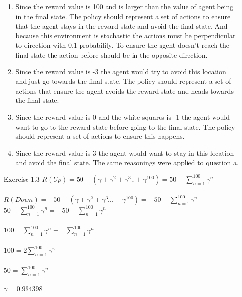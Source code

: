 \documentclass[letterpaper, 12pt]{article}
\begin{document}
\begin{enumerate}
    \begin{enumerate}
        \item Since the reward value is 100 and is larger than the value of agent being in the final state. 
        The policy should represent a set of actions to ensure that the agent stays in the reward state and avoid the final state. 
        And because this environment is stochastic the actions must be perpendicular to direction with 0.1 probability. 
        To ensure the agent doesn't reach the final state the action before should be in the opposite direction.
        \item Since the reward value is -3 the agent would try to avoid this location and just go towards the final state.
        The policy should represent a set of actions that ensure the agent avoids the reward state and heads towards the final state.

        \item Since the reward value is 0 and the white squares is -1 the agent would want to go to the reward state before going to the final state.
        The policy should represent a set of actions to ensure this happens.

        \item Since the reward value is 3 the agent would want to stay in this location and avoid the final state. The same reasonings were applied to question a. 
    \end{enumerate}
        
    \item[Exercise 1.3] 
         $R(Up) = 50 - (\gamma + \gamma^2 + \gamma^3 .. + \gamma^{100}) = 
                50 - \sum\limits_{n=1}^{100} \gamma^n$ \\\\
         $R(Down) = -50 - (\gamma + \gamma^2 + \gamma^3 ... + \gamma^{100}) = 
                -50 - \sum\limits_{n=1}^{100} \gamma^n$ \\ 
  
         $50 - \sum\limits_{n=1}^{100} \gamma^n = -50 - \sum\limits_{n=1}^{100} \gamma^n$ \\\\  
         $100 - \sum\limits_{n=1}^{100} \gamma^n = - \sum\limits_{n=1}^{100} \gamma^n$ \\\\
         $100 = 2\sum\limits_{n=1}^{100} \gamma^n$ \\\\
         $50 = \sum\limits_{n=1}^{100} \gamma^n$ \\\\
         $\gamma = 0.984398$ \\


\end{enumerate}
\end{document}
